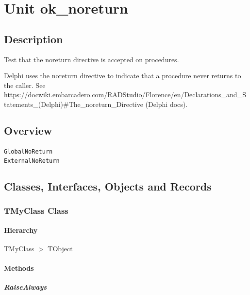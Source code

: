 \documentclass{report}
\begin{document}
\newlength{\tmplength}
\chapter{Unit ok{\_}noreturn}
\section{Description}
Test that the noreturn directive is accepted on procedures.\hfill\vspace*{1ex}

 Delphi uses the noreturn directive to indicate that a procedure never returns to the caller. See https://docwiki.embarcadero.com/RADStudio/Florence/en/Declarations{\_}and{\_}Statements{\_}(Delphi){\#}The{\_}noreturn{\_}Directive (Delphi docs).
\section{Overview}
\begin{description}
\item[\texttt{\begin{ttfamily}TMyClass\end{ttfamily} Class}]
\end{description}
\begin{description}
\item[\texttt{GlobalNoReturn}]
\item[\texttt{ExternalNoReturn}]
\end{description}
\section{Classes, Interfaces, Objects and Records}
\subsection*{TMyClass Class}
\subsubsection*{\large{\textbf{Hierarchy}}\normalsize\hspace{1ex}\hfill}
TMyClass {$>$} TObject
\subsubsection*{\large{\textbf{Methods}}\normalsize\hspace{1ex}\hfill}
\paragraph*{RaiseAlways}\hspace*{\fill}
\end{document}

